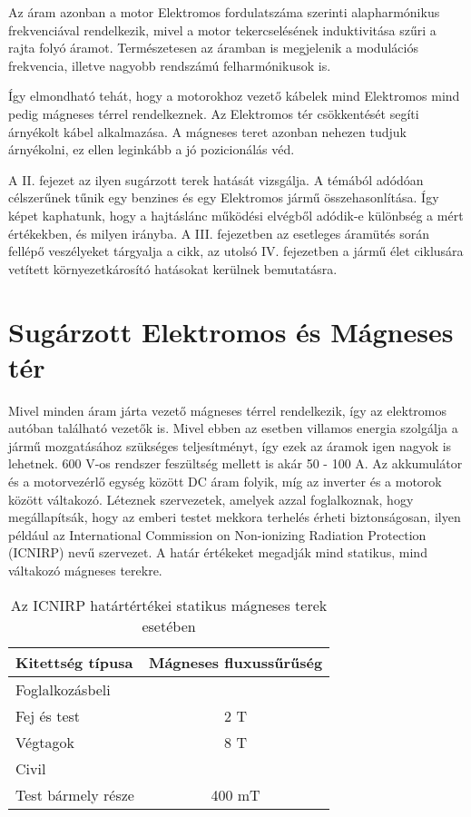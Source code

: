 Az áram azonban a motor Elektromos fordulatszáma szerinti alapharmónikus frekvenciával rendelkezik, mivel a motor tekercselésének induktivitása szűri a rajta folyó áramot. Természetesen az áramban is megjelenik a modulációs frekvencia, illetve nagyobb rendszámú felharmónikusok is.

Így elmondható tehát, hogy a motorokhoz vezető kábelek mind Elektromos mind pedig mágneses térrel rendelkeznek. Az Elektromos tér csökkentését segíti árnyékolt kábel alkalmazása. A mágneses teret azonban nehezen tudjuk árnyékolni, ez ellen leginkább a jó pozicionálás véd.

A II. fejezet az ilyen sugárzott terek hatását vizsgálja. A témából adódóan célszerűnek tűnik egy benzines és egy Elektromos jármű összehasonlítása. Így képet kaphatunk, hogy a hajtáslánc működési elvégből adódik-e különbség a mért értékekben, és milyen irányba. A III. fejezetben az esetleges áramütés során fellépő veszélyeket tárgyalja a cikk, az utolsó IV. fejezetben a jármű élet ciklusára vetített környezetkárosító hatásokat kerülnek bemutatásra.


\section{Sugárzott Elektromos és Mágneses tér}

Mivel minden áram járta vezető mágneses térrel rendelkezik, így az elektromos autóban található vezetők is.  Mivel ebben az esetben villamos energia szolgálja a jármű mozgatásához szükséges teljesítményt, így ezek az áramok igen nagyok is lehetnek. 600 V-os rendszer feszültség mellett is akár 50 - 100 A. Az akkumulátor és a motorvezérlő egység között DC áram folyik, míg az inverter és a motorok között váltakozó. Léteznek szervezetek, amelyek azzal foglalkoznak, hogy megállapítsák, hogy az emberi testet mekkora terhelés érheti biztonságosan, ilyen például az International Commission on Non-ionizing Radiation Protection (ICNIRP) nevű szervezet. A határ értékeket megadják mind statikus, mind váltakozó mágneses terekre.

\begin{table}[h]
\centering
\label{my-label}
\begin{tabular}{lc}
\hline
Kitettség típusa   & Mágneses fluxussűrűség \\ \hline
Foglalkozásbeli    &                        \\
\hspace{3mm}Fej és test        & 2 T                    \\
\hspace{3mm}Végtagok           & 8 T                    \\
Civil              &                        \\
\hspace{3mm}Test bármely része & 400 mT                 \\ \hline
\end{tabular}
\caption{Az ICNIRP határtértékei statikus mágneses terek esetében\cite{artice:icnrip1}}
\end{table}

